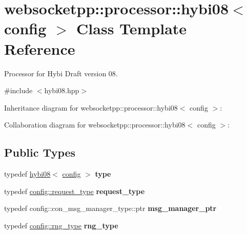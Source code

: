 \hypertarget{classwebsocketpp_1_1processor_1_1hybi08}{}\section{websocketpp\+:\+:processor\+:\+:hybi08$<$ config $>$ Class Template Reference}
\label{classwebsocketpp_1_1processor_1_1hybi08}


Processor for Hybi Draft version 08.  




{\ttfamily \#include $<$hybi08.\+hpp$>$}



Inheritance diagram for websocketpp\+:\+:processor\+:\+:hybi08$<$ config $>$\+:


Collaboration diagram for websocketpp\+:\+:processor\+:\+:hybi08$<$ config $>$\+:
\subsection*{Public Types}
\begin{DoxyCompactItemize}
\item 
\mbox{\label{classwebsocketpp_1_1processor_1_1hybi08_adb295a175e3c45fad340b974c9daa780}} 
typedef \mbox{\hyperlink{classwebsocketpp_1_1processor_1_1hybi08}{hybi08}}$<$ \mbox{\hyperlink{classconfig}{config}} $>$ {\bfseries type}
\item 
\mbox{\label{classwebsocketpp_1_1processor_1_1hybi08_a5cb5a8054a9e10706e672de379284a2e}} 
typedef \mbox{\hyperlink{classwebsocketpp_1_1http_1_1parser_1_1request}{config\+::request\+\_\+type}} {\bfseries request\+\_\+type}
\item 
\mbox{\label{classwebsocketpp_1_1processor_1_1hybi08_a4ad1477463712031772e8e8a48cdc7b0}} 
typedef config\+::con\+\_\+msg\+\_\+manager\+\_\+type\+::ptr {\bfseries msg\+\_\+manager\+\_\+ptr}
\item 
\mbox{\label{classwebsocketpp_1_1processor_1_1hybi08_af8b10cde566c24d29a94f50716fdcddd}} 
typedef \mbox{\hyperlink{classwebsocketpp_1_1random_1_1none_1_1int__generator}{config\+::rng\+\_\+type}} {\bfseries rng\+\_\+type}
\end{DoxyCompactItemize}
